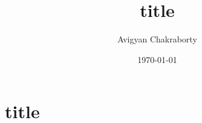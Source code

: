 \documentclass[12pt]{scrartcl}
\title{title}
\author{Avigyan Chakraborty}
\date{\today}
\begin{document}
\maketitle

\section{title}
\end{document}
